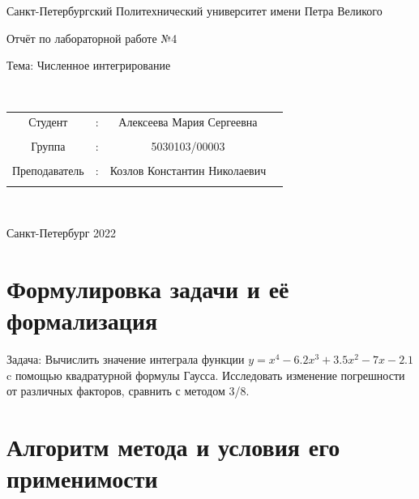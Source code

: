 \documentclass[a4paper]{article}
\begin{document}
\begin{center} 
\hfill \break 
\large{Санкт-Петербургский Политехнический университет имени Петра Великого}\\ 
 
 \hfill \break 
\hfill\break 
\hfill \break 
\hfill \break 
\hfill \break 
\begin{center}\large{Отчёт по лабораторной работе №4} \end{center}  
\hfill \break 
\large{Тема: Численное интегрирование} 
\hfill \break 
\hfill \break 
 
\hfill \break 
\hfill \break 
\\ 
\hfill \break 
\hfill \break 
\end{center} 


\normalsize{ 
\begin{tabular}{cccc} 
Студент & : & Алексеева Мария Сергеевна\\\\ 
Группа & : & 5030103/00003 \\\\ 
Преподаватель & : & Козлов Константин Николаевич \\\\ 
\end{tabular} 
}\\ 
\hfill \break 
\hfill \break 
\hfill \break 
\begin{center} Санкт-Петербург 2022 \end{center} 
\thispagestyle{empty} %
 
\newpage 
	
\section{Формулировка задачи и её формализация} 
Задача: Вычислить значение интеграла функции $y = x^4-6.2x^3+3.5x^2-7x-2.1$ c помощью квадратурной формулы Гаусса. Исследовать изменение погрешности от различных факторов, сравнить с методом 3/8.
\section{Алгоритм метода и условия его применимости} 
\end{document}
